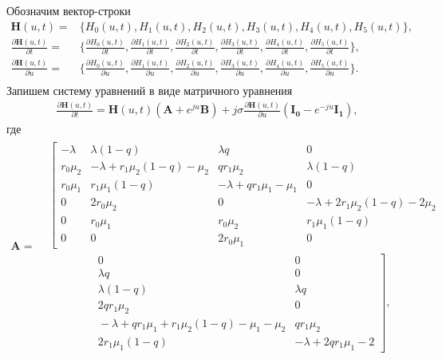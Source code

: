 Обозначим вектор-строки
\begin{align*}
	\boldsymbol{H}(u,t)=&\{H_{0}(u,t),H_{1}(u,t),H_{2}(u,t),H_{3}(u,t),H_{4}(u,t),H_{5}(u,t)\},\\
	\frac{\partial \boldsymbol{H}(u,t)}{\partial t}=&\{\frac{\partial H_{0}(u,t)}{\partial t},\frac{\partial H_{1}(u,t)}{\partial t},\frac{\partial H_{2}(u,t)}{\partial t},\frac{\partial H_{3}(u,t)}{\partial t},\frac{\partial H_{4}(u,t)}{\partial t},\frac{\partial H_{5}(u,t)}{\partial t}\},\\
	\frac{\partial \boldsymbol{H}(u,t)}{\partial u}=&\{\frac{\partial H_{0}(u,t)}{\partial u},\frac{\partial H_{1}(u,t)}{\partial u},\frac{\partial H_{2}(u,t)}{\partial u},\frac{\partial H_{3}(u,t)}{\partial u},\frac{\partial H_{4}(u,t)}{\partial u},\frac{\partial H_{5}(u,t)}{\partial u}\}.\\
\end{align*} 
Запишем систему уравнений в виде матричного уравнения
\begin{align*}
	\frac{\partial \boldsymbol{H}(u,t)}{\partial t}=\boldsymbol{H}(u,t)(\boldsymbol{A}+e^{ju}\boldsymbol{B})+j\sigma\frac{\partial \boldsymbol{H}(u,t)}{\partial u}(\boldsymbol{I_{0}}-e^{-ju}\boldsymbol{I_{1}}),
\end{align*} 
где
\begin{gather*} 
	\boldsymbol{A} =
	\!\begin{aligned}
		&
		\left[\begin{matrix}- \lambda & \lambda \left(1 - q\right) & \lambda q & 0%
			\\r_{0} \mu_{2} & - \lambda + r_{1} \mu_{2} \left(1 - q\right) - \mu_{2} & q r_{1} \mu_{2} & \lambda \left(1 - q\right) %
			\\r_{0} \mu_{1} & r_{1} \mu_{1} \left(1 - q\right) & - \lambda + q r_{1} \mu_{1} - \mu_{1} & 0%
			\\0 & 2 r_{0} \mu_{2} & 0 & - \lambda + 2 r_{1} \mu_{2} \left(1 - q\right) - 2 \mu_{2} %
			\\0 & r_{0} \mu_{1} & r_{0} \mu_{2} & r_{1} \mu_{1} \left(1 - q\right) %
			\\0 & 0 & 2 r_{0} \mu_{1} & 0 %
		\end{matrix}\right.\\
		&\qquad\qquad
		\left.\begin{matrix}
			{}0 & 0
			\\ {}\lambda q & 0
			\\ {}\lambda \left(1 - q\right) & \lambda q
			\\ {}2 q r_{1} \mu_{2} & 0
			\\ {}- \lambda + q r_{1} \mu_{1} + r_{1} \mu_{2} \left(1 - q\right) - \mu_{1} - \mu_{2} & q r_{1} \mu_{2}
			\\ {}2 r_{1} \mu_{1} \left(1 - q\right) & - \lambda + 2 q r_{1} \mu_{1} - 2
		\end{matrix}\right],
	\end{aligned}
\end{gather*}

